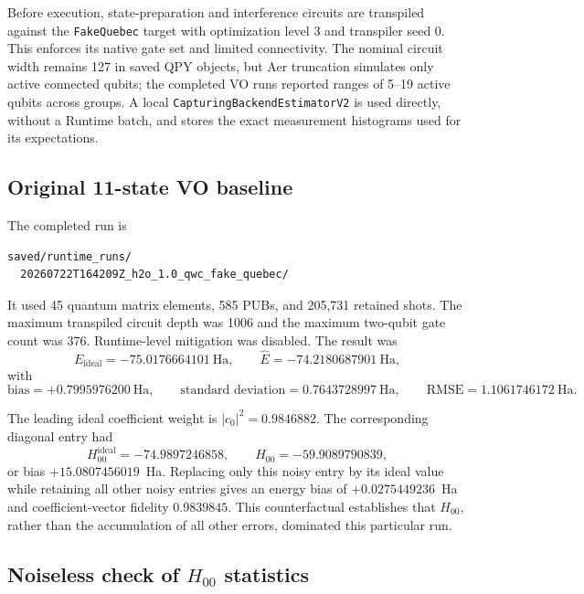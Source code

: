 \documentclass[11pt]{article}
\newcommand{\Eideal}{E_{\mathrm{ideal}}}
\newcommand{\code}[1]{\texttt{#1}}
\begin{document}
Before execution, state-preparation and interference circuits are transpiled
against the \code{FakeQuebec} target with optimization level 3 and transpiler
seed 0.  This enforces its native gate set and limited connectivity.  The
nominal circuit width remains 127 in saved QPY objects, but Aer truncation
simulates only active connected qubits; the completed VO runs reported ranges
of 5--19 active qubits across groups.  A local
\code{CapturingBackendEstimatorV2} is used directly, without a Runtime batch,
and stores the exact measurement histograms used for its expectations.

\subsection{Original 11-state VO baseline}

The completed run is
\begin{verbatim}
saved/runtime_runs/
  20260722T164209Z_h2o_1.0_qwc_fake_quebec/
\end{verbatim}
It used 45 quantum matrix elements, 585 PUBs, and 205,731 retained shots.
The maximum transpiled circuit depth was 1006 and the maximum two-qubit gate
count was 376.  Runtime-level mitigation was disabled.  The result was
\[
  \Eideal=-75.0176664101\ \mathrm{Ha},\qquad
  \widehat E=-74.2180687901\ \mathrm{Ha},
\]
with
\[
 \text{bias}=+0.7995976200\ \mathrm{Ha},\qquad
 \text{standard deviation}=0.7643728997\ \mathrm{Ha},\qquad
 \text{RMSE}=1.1061746172\ \mathrm{Ha}.
\]

The leading ideal coefficient weight is
$|c_0|^2=0.9846882$.  The corresponding diagonal entry had
\[
 H_{00}^{\mathrm{ideal}}=-74.9897246858,\qquad
 \widehat H_{00}=-59.9089790839,
\]
or bias $+15.0807456019$~Ha.  Replacing only this noisy entry by its ideal
value while retaining all other noisy entries gives an energy bias of
$+0.0275449236$~Ha and coefficient-vector fidelity $0.9839845$.  This
counterfactual establishes that $H_{00}$, rather than the accumulation of all
other errors, dominated this particular run.

\subsection{Noiseless check of \texorpdfstring{$H_{00}$}{H00} statistics}
\end{document}
